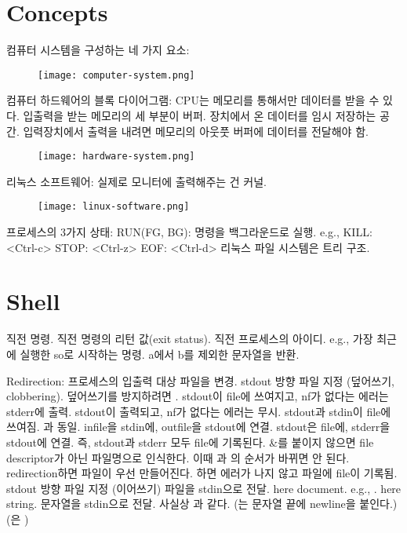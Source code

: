 \section{Concepts}

\bitmz
  \itm 컴퓨터 시스템을 구성하는 네 가지 요소: \begin{figure}[h]\centering\texttt{[image: computer-system.png]}\end{figure}
  \itm 컴퓨터 하드웨어의 블록 다이어그램: CPU는 메모리를 통해서만 데이터를 받을 수 있다. 입출력을 받는 메모리의 세 부분이 버퍼. 장치에서 온 데이터를 임시 저장하는 공간. 입력장치에서 출력을 내려면 메모리의 아웃풋 버퍼에 데이터를 전달해야 함. \begin{figure}[h]\centering\texttt{[image: hardware-system.png]}\end{figure}
  \itm 리눅스 소프트웨어: 실제로 모니터에 출력해주는 건 커널. \begin{figure}[h]\centering\texttt{[image: linux-software.png]}\end{figure}
  \itm 프로세스의 3가지 상태:
  \bitmz
    \itm RUN(FG, BG): 명령을 백그라운드로 실행. e.g., 
    \itm KILL: <Ctrl-c>
    \itm STOP: <Ctrl-z>
  \eitmz
  \itm EOF: <Ctrl-d>
  \itm 리눅스 파일 시스템은 트리 구조.
\eitmz

\section{Shell}

\bitmz
  \itm \code{!!} \rarr 직전 명령.
  \itm {} \rarr 직전 명령의 리턴 값(exit status).
  \itm \code{\$!} \rarr 직전 프로세스의 아이디. e.g., 
  \itm {} \rarr 가장 최근에 실행한 so로 시작하는 명령.
  \itm {} \rarr a에서 b를 제외한 문자열을 반환.

  \itm Redirection: 프로세스의 입출력 대상 파일을 변경.
  \bitmz
    \itm \code{>} stdout 방향 파일 지정 (덮어쓰기, clobbering). 덮어쓰기를 방지하려면 .
    \bitmz
      \itm {} \rarr stdout이 file에 쓰여지고, nf가 없다는 에러는 stderr에 출력.
      \itm {} \rarr stdout이 출력되고, nf가 없다는 에러는 무시.
      \itm {} \rarr stdout과 stdin이 file에 쓰여짐. 과 동일.
      \itm {} \rarr infile을 stdin에, outfile을 stdout에 연결.
      \itm {} \rarr stdout은 file에, stderr을 stdout에 연결. 즉, stdout과 stderr 모두 file에 기록된다. \&를 붙이지 않으면 file descriptor가 아닌 파일명으로 인식한다. 이때 과 의 순서가 바뀌면 안 된다.
      \itm redirection하면 파일이 우선 만들어진다. 하면 에러가 나지 않고 파일에 file이 기록됨.
    \eitmz
    \itm \code{>>} stdout 방향 파일 지정 (이어쓰기)
    \itm \code{<} 파일을 stdin으로 전달.
    \itm \code{<<} here document. e.g., .
    \itm \code{<<<} here string. 문자열을 stdin으로 전달. 사실상 과 같다.
    \bitmz
      \itm {} \rarr {} (\code{<<<}는 문자열 끝에 newline을 붙인다.)
      \itm {} \rarr {} (은 )
    \eitmz
  \eitmz

